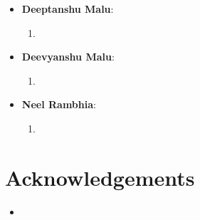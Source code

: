 \documentclass[11pt]{article}
\begin{document}
\begin{itemize}
    \item \textbf{Deeptanshu Malu}:
    \begin{enumerate}
        \item 
    \end{enumerate}

    \item \textbf{Deevyanshu Malu}:
    \begin{enumerate}
        \item 
    \end{enumerate}

    \item \textbf{Neel Rambhia}:
    \begin{enumerate}
        \item 
    \end{enumerate}
\end{itemize}

\section*{Acknowledgements}

\begin{itemize}
    \item 
\end{itemize}
\end{document}
